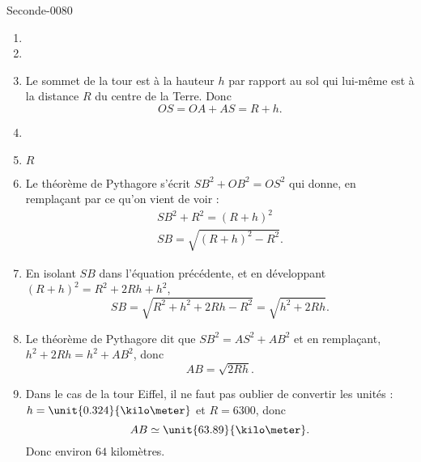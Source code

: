
\begin{corrige}{Seconde-0080}


    \begin{enumerate}
        \item
        \item
        \item
            Le sommet de la tour est à la hauteur \( h\) par rapport au sol qui lui-même est à la distance \( R\) du centre de la Terre. Donc
            \begin{equation}
                OS=OA+AS=R+h.
            \end{equation}
        \item
        \item
            \( R\)
        \item
            Le théorème de Pythagore s'écrit \( SB^2+OB^2=OS^2\) qui donne, en remplaçant par ce qu'on vient de voir :
            \begin{subequations}
                \begin{align}
                    SB^2+R^2=(R+h)^2\\
                    SB=\sqrt{(R+h)^2-R^2}.
                \end{align}
            \end{subequations}
        \item
            En isolant \( SB\) dans l'équation précédente, et en développant \( (R+h)^2=R^2+2Rh+h^2\),
            \begin{equation}
                SB=\sqrt{R^2+h^2+2Rh-R^2}=\sqrt{h^2+2Rh}.
            \end{equation}
        \item
            Le théorème de Pythagore dit que \( SB^2=AS^2+AB^2\) et en remplaçant, \( h^2+2Rh=h^2+AB^2\), donc
            \begin{equation}
                AB=\sqrt{2Rh}.
            \end{equation}
        \item
            Dans le cas de la tour Eiffel, il ne faut pas oublier de convertir les unités : \( h=\unit{0.324}{\kilo\meter}\) et \( R=6300\), donc
            \begin{equation}
                AB\simeq\unit{63.89}{\kilo\meter}.
            \end{equation}
            Donc environ \( 64\) kilomètres.
    \end{enumerate}

\end{corrige}
